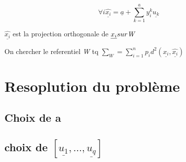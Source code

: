 \documentclass[a4paper]{report}
\begin{document}
$$\forall i \underline{\widehat{x_{i}}}=\underline{a}+\sum^{a}_{k=1}y^{k}_{i}\underline{u_{k}}$$

$\underline{\widehat{x_{i}}}$ est la projection orthogonale de $\underline{x_{i}} sur \emph{W}$

On chercher le referentiel \emph{W} tq $\sum _{W}=\sum^{n}_{i=1}p_{i}d^{2}(\underline{x_{i}}, \underline{\widehat{x_{i}}})$

\section{Resoplution du problème}

\subsection{Choix de a}

\subsection{choix de $[\underline{u_{1}}, \hdots, \underline{u_{q}}]$}
\end{document}
